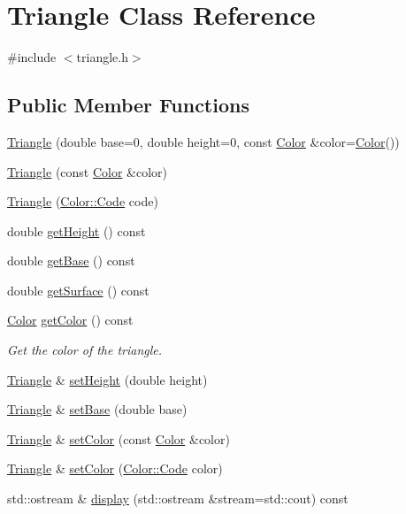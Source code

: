 \hypertarget{classTriangle}{}\section{Triangle Class Reference}
\label{classTriangle}


{\ttfamily \#include $<$triangle.\+h$>$}

\subsection*{Public Member Functions}
\begin{DoxyCompactItemize}
\item 
\hyperlink{classTriangle_a4b04a188ad5305dc0bf626baeb020b0a}{Triangle} (double base=0, double height=0, const \hyperlink{classColor}{Color} \&color=\hyperlink{classColor}{Color}())
\item 
\hyperlink{classTriangle_abb2265599f78e829e36c9ae3144c1702}{Triangle} (const \hyperlink{classColor}{Color} \&color)
\item 
\hyperlink{classTriangle_a60f605f31c2d907cf063020725ba4e88}{Triangle} (\hyperlink{classColor_a20a7b04657c1d83fae5d54514d3f1622}{Color\+::\+Code} code)
\item 
double \hyperlink{classTriangle_a87849ce466ed942076f1cece11047981}{get\+Height} () const
\item 
double \hyperlink{classTriangle_aae4fecc31aac51c2db24b56e2e061b8c}{get\+Base} () const
\item 
double \hyperlink{classTriangle_a43ee8a9653872903a782615d2fc5e977}{get\+Surface} () const
\item 
\hyperlink{classColor}{Color} \hyperlink{classTriangle_a515e7990f136e3ce529924d422d062d2}{get\+Color} () const
\begin{DoxyCompactList}\small\item\em Get the color of the triangle. \end{DoxyCompactList}\item 
\hyperlink{classTriangle}{Triangle} \& \hyperlink{classTriangle_a3620f5aea366eb716b6279f54613257d}{set\+Height} (double height)
\item 
\hyperlink{classTriangle}{Triangle} \& \hyperlink{classTriangle_a383d64ede7a2ca52e7f166ca03887041}{set\+Base} (double base)
\item 
\hyperlink{classTriangle}{Triangle} \& \hyperlink{classTriangle_a52368ea66c07dcbb43372d36c832dc35}{set\+Color} (const \hyperlink{classColor}{Color} \&color)
\item 
\hyperlink{classTriangle}{Triangle} \& \hyperlink{classTriangle_a9d8a052b74403f501584efd4ebdee153}{set\+Color} (\hyperlink{classColor_a20a7b04657c1d83fae5d54514d3f1622}{Color\+::\+Code} color)
\item 
std\+::ostream \& \hyperlink{classTriangle_aaa77891af77edc39ac1809fbbfee0fd4}{display} (std\+::ostream \&stream=std\+::cout) const
\end{DoxyCompactItemize}


